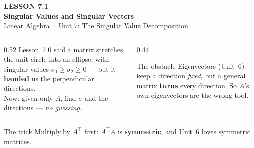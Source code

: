 \documentclass[aspectratio=169, 11pt]{beamer}
\newcommand{\T}{^{\top}}
\begin{document}
{
\begin{frame}[plain]
  \vspace{2.8cm}\hspace{0.55cm}%
  \begin{minipage}{0.9\textwidth}
    {\color{goldacc}\bfseries\small LESSON 7.1}\\[0.5cm]
    {\color{white}\bfseries\LARGE Singular Values and Singular Vectors}\\[1.0cm]
    {\color{blushmid}\small Linear Algebra~$\cdot$~Unit 7: The Singular Value Decomposition}
  \end{minipage}
\end{frame}
}

\begin{frame}[t, plain]
  \begin{columns}[T]
    \begin{column}{0.52\textwidth}
      Lesson~7.0 said a matrix stretches the unit circle into an ellipse, with singular values
      $\sigma_1\ge\sigma_2\ge0$ --- but it \textbf{handed} us the perpendicular directions.\\[6pt]
      Now: given only $A$, find $\sigma$ and the directions --- \emph{no guessing}.
    \end{column}
    \begin{column}{0.44\textwidth}
      \begin{block}{The obstacle}
        Eigenvectors (Unit~6) keep a direction \emph{fixed}, but a general matrix \textbf{turns} every
        direction. So $A$'s own eigenvectors are the wrong tool.
      \end{block}
    \end{column}
  \end{columns}
  \vspace{2pt}
  \begin{block}{The trick}
    Multiply by $A\T$ first: $A\T A$ is \textbf{symmetric}, and Unit~6 loves symmetric matrices.
  \end{block}
\end{frame}
\end{document}
